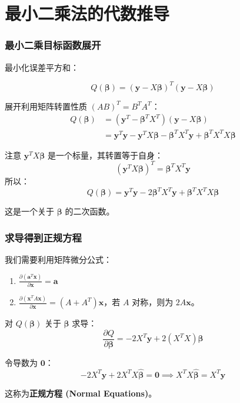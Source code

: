 
\section[代数推导]{最小二乘法的代数推导}


\begin{frame}
\frametitle{最小二乘目标函数展开}

最小化误差平方和：

\[
Q(\boldsymbol{\beta}) = (\mathbf{y} - X\boldsymbol{\beta})^T (\mathbf{y} - X\boldsymbol{\beta})
\]

展开利用矩阵转置性质 $(AB)^T = B^T A^T$：
\[
\begin{aligned}
Q(\boldsymbol{\beta}) &= (\mathbf{y}^T - \boldsymbol{\beta}^T X^T) (\mathbf{y} - X\boldsymbol{\beta}) \\
&= \mathbf{y}^T\mathbf{y} - \mathbf{y}^T X\boldsymbol{\beta} - \boldsymbol{\beta}^T X^T \mathbf{y} + \boldsymbol{\beta}^T X^T X \boldsymbol{\beta}
\end{aligned}
\]

注意 $\mathbf{y}^T X\boldsymbol{\beta}$ 是一个标量，其转置等于自身：
\[
(\mathbf{y}^T X\boldsymbol{\beta})^T = \boldsymbol{\beta}^T X^T \mathbf{y}
\]
所以：
\[
Q(\boldsymbol{\beta}) = \mathbf{y}^T\mathbf{y} - 2\boldsymbol{\beta}^T X^T \mathbf{y} + \boldsymbol{\beta}^T X^T X \boldsymbol{\beta}
\]

这是一个关于 $\boldsymbol{\beta}$ 的二次函数。
\end{frame}


\begin{frame}
\frametitle{求导得到正规方程}

我们需要利用矩阵微分公式：
\begin{enumerate}
    \item $\frac{\partial (\mathbf{a}^T \mathbf{x})}{\partial \mathbf{x}} = \mathbf{a}$
    \item $\frac{\partial (\mathbf{x}^T A \mathbf{x})}{\partial \mathbf{x}} = (A + A^T)\mathbf{x}$，若 $A$ 对称，则为 $2A\mathbf{x}$。
\end{enumerate}

\vspace{1em}
对 $Q(\boldsymbol{\beta})$ 关于 $\boldsymbol{\beta}$ 求导：
\[
\frac{\partial Q}{\partial \boldsymbol{\beta}} = -2X^T \mathbf{y} + 2(X^T X)\boldsymbol{\beta}
\]

令导数为 $\mathbf{0}$：
\[
-2X^T \mathbf{y} + 2X^T X \hat{\boldsymbol{\beta}} = \mathbf{0} \implies X^T X \hat{\boldsymbol{\beta}} = X^T \mathbf{y}
\]

这称为\textbf{正规方程 (Normal Equations)}。
\end{frame}

